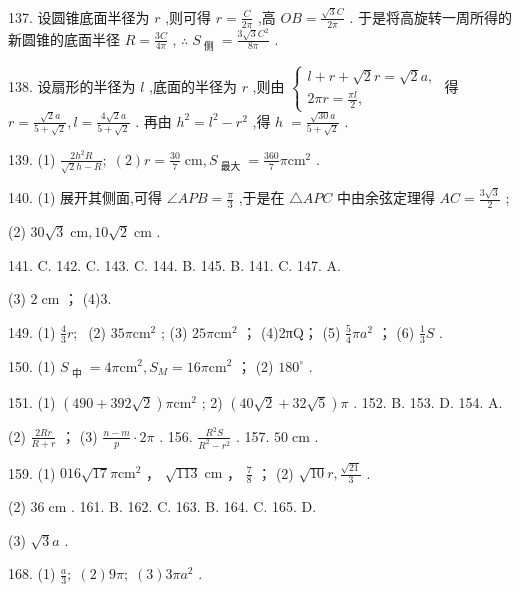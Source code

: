 \documentclass[10pt]{article}
\newcommand*\circled[1]{\tikz[baseline=(char.base)]{\node[shape=circle,draw,inner sep=1.5pt] (char) {\small #1};}}
\begin{document}
137. 设圆锥底面半径为 \(r\) ,则可得 \(r = \frac{C}{2\pi }\) ,高 \({OB} = \frac{\sqrt{3}C}{2\pi }\) . 于是将高旋转一周所得的新圆锥的底面半径 \(R = \frac{3C}{4\pi }\) , \(\therefore \;{S}_{\text{ 侧 }} = \frac{3\sqrt{3}{C}^{2}}{8\pi }\) .

138. 设扇形的半径为 \(l\) ,底面的半径为 \(r\) ,则由 \(\left\{  \begin{array}{l} l + r + \sqrt{2}r = \sqrt{2}a, \\  {2\pi r} = \frac{\pi l}{2}, \end{array}\right.\) 得 \(r = \frac{\sqrt{2}a}{5 + \sqrt{2}},l = \frac{4\sqrt{2}a}{5 + \sqrt{2}}\) . 再由 \({h}^{2} = {l}^{2} - {r}^{2}\) ,得 \(h \; = \frac{\sqrt{30}a}{5 + \sqrt{2}}\) .

139. (1) \(\frac{2{h}^{2}R}{\sqrt{2}h - R};\;\left( 2\right) r = \frac{30}{7}\mathrm{\;{cm}},{S}_{\text{ 最大 }} = \frac{360}{7}\pi {\mathrm{{cm}}}^{2}\) .

140. (1) 展开其侧面,可得 \(\angle {APB} = \frac{\pi }{3}\) ,于是在 \(\bigtriangleup {APC}\) 中由余弦定理得 \({AC} = \frac{3\sqrt{3}}{2}\) ;

(2) \({30}\sqrt{3}\mathrm{\;{cm}},{10}\sqrt{2}\mathrm{\;{cm}}\) .

141. C. 142. C. 143. C. 144. B. 145. B. 141. C. 147. A.

(3) \(2\mathrm{\;{cm}}\) ； (4)3.

149. (1) \(\frac{4}{3}r;\;\) (2) \({35\pi }{\mathrm{{cm}}}^{2}\) ; (3) \({25\pi }{\mathrm{{cm}}}^{2}\) ； (4)2πQ； (5) \(\frac{5}{4}\pi {a}^{2}\) ； (6) \(\frac{1}{3}S\) .

150. (1) \({S}_{\text{ 中 }} = {4\pi }{\mathrm{{cm}}}^{2},{S}_{M} = {16\pi }{\mathrm{{cm}}}^{2}\) ； (2) \({180}^{ \circ  }\) .

151. (1) \(\left( {{490} + {392}\sqrt{2}}\right) \pi {\mathrm{{cm}}}^{2}\) ; 2) \(\left( {{40}\sqrt{2} + {32}\sqrt{5}}\right) \pi\) . 152. B. 153. D. 154. A.

(2) \(\frac{2Rr}{R + r}\) ； (3) \(\frac{n - m}{p} \cdot  {2\pi }\) . 156. \(\frac{{R}^{2}S}{{R}^{2} - {r}^{2}}\) . 157. \({50}\mathrm{\;{cm}}\) .

159. (1) \({{016}\sqrt{17}}\pi {\mathrm{{cm}}}^{2}\) ， \circled{2}  \(\sqrt{113}\mathrm{\;{cm}}\) ， \circled{3}  \(\frac{7}{8}\) ； (2) \(\sqrt{10}r,\frac{\sqrt{21}}{3}\) .

(2) \({36}\mathrm{\;{cm}}\) . 161. B. 162. C. 163. B. 164. C. 165. D.

(3) \(\sqrt{3}a\) .

168. (1) \(\frac{a}{3};\;\left( 2\right) {9\pi };\;\left( 3\right) {3\pi }{a}^{2}\) .
\end{document}
